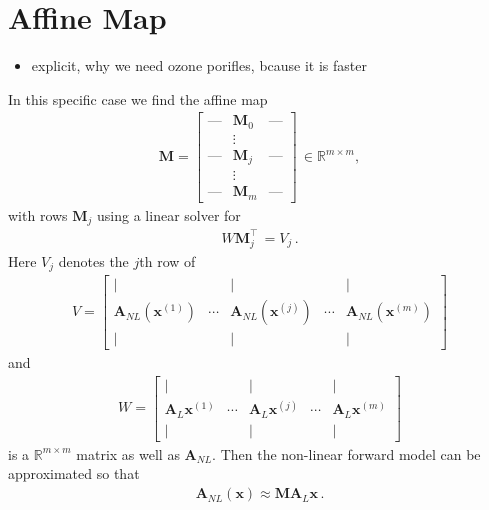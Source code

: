 \section{Affine Map}
\begin{itemize}
	\item explicit, why we need ozone porifles, bcause it is faster
\end{itemize}
In this specific case we find the affine map
\begin{align}
	\bm{M} = \begin{bmatrix}
		\text{---} & \bm{M}_0 &   \text{---}  \\
		&  \vdots  & \\
		\text{---}& \bm{M}_j &  \text{---} \\
		&  \vdots  & \\
		\text{---} & \bm{M}_m &   \text{---}
	\end{bmatrix} \, \in \mathbb{R}^{m \times m} ,
\end{align}
with rows $\bm{M}_j$ using a linear solver for
\begin{align}
	W \bm{M}_j^\top \, = V_{j} \, .
\end{align}
Here $V_j$ denotes the $j$th row of  
\begin{align}
	V = \begin{bmatrix}
		\vert&   &  \vert & & \vert \\
		\bm{A}_{NL} (\bm{x}^{(1)} ) &  \cdots& \bm{A}_{NL} (\bm{x}^{(j)} )&  \cdots & \bm{A}_{NL} (\bm{x}^{(m)})  \\
		\vert&   &  \vert & & \vert 
	\end{bmatrix}
\end{align}
and
\begin{align}
	W = \begin{bmatrix}
		\vert&   &  \vert & & \vert \\
		\bm{A}_{L} \bm{x}^{(1)} &  \cdots& \bm{A}_{L} \bm{x}^{(j)} &  \cdots & \bm{A}_{L} \bm{x}^{(m)} \\
		\vert&   &  \vert & & \vert 
	\end{bmatrix}
\end{align}
is a $\mathbb{R}^{m \times m} $ matrix as well as $\bm{A}_{NL}$.
Then the non-linear forward model can be approximated so that
\begin{align}
	\bm{A}_{NL}(\bm{x}) \approx \bm{M A}_L \bm{x}\, .
\end{align}

